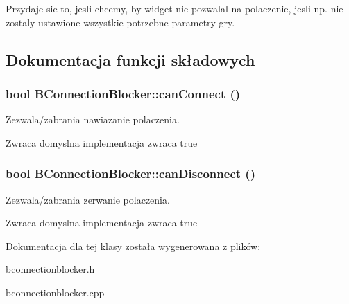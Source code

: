 Przydaje sie to, jesli chcemy, by widget nie pozwalal na polaczenie, jesli np. nie zostaly ustawione wszystkie potrzebne parametry gry. 

\subsection{Dokumentacja funkcji składowych}
\hypertarget{class_b_connection_blocker_a2ebcdef0e5570c7331036dd5b6ba4448}{
\subsubsection[{canConnect}]{\setlength{\rightskip}{0pt plus 5cm}bool BConnectionBlocker::canConnect ()}}
\label{class_b_connection_blocker_a2ebcdef0e5570c7331036dd5b6ba4448}


Zezwala/zabrania nawiazanie polaczenia. 

\begin{DoxyReturn}{Zwraca}
domyslna implementacja zwraca true 
\end{DoxyReturn}
\hypertarget{class_b_connection_blocker_a81e8782c93ac1943a7e19b4ed7ced792}{
\subsubsection[{canDisconnect}]{\setlength{\rightskip}{0pt plus 5cm}bool BConnectionBlocker::canDisconnect ()}}
\label{class_b_connection_blocker_a81e8782c93ac1943a7e19b4ed7ced792}


Zezwala/zabrania zerwanie polaczenia. 

\begin{DoxyReturn}{Zwraca}
domyslna implementacja zwraca true 
\end{DoxyReturn}


Dokumentacja dla tej klasy została wygenerowana z plików:\begin{DoxyCompactItemize}
\item 
bconnectionblocker.h\item 
bconnectionblocker.cpp\end{DoxyCompactItemize}
